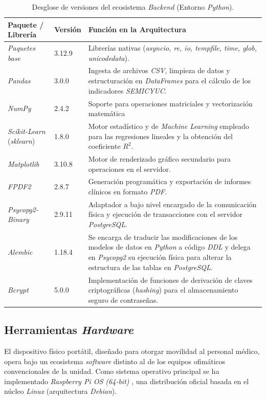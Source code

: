 \begin{table}[hbt!]
\centering
\begin{tabular}{llp{8cm}}
\hline
\textbf{Paquete / Librería} & \textbf{Versión} & \textbf{Función en la Arquitectura} \\ \hline
\textit{Paquetes base} & 3.12.9 & Librerías nativas (\textit{asyncio, re, io, tempfile, time, glob, unicodedata}). \cite{bibpython}\\ 
\textit{Pandas} & 3.0.0 & Ingesta de archivos \textit{CSV}, limpieza de datos y estructuración en \textit{DataFrames} para el cálculo de los indicadores \textit{SEMICYUC}. \cite{pandas}\\ 
\textit{NumPy} & 2.4.2 & Soporte para operaciones matriciales y vectorización matemática \cite{numpy}\\ 
\textit{Scikit-Learn} (\textit{sklearn}) & 1.8.0 & Motor estadístico y de \textit{Machine Learning} empleado para las regresiones lineales y la obtención del coeficiente $R^2$. \cite{SKlearn}\\ 
\textit{Matplotlib} & 3.10.8 & Motor de renderizado gráfico secundario para operaciones en el servidor. \cite{Matplotlib}\\ 
\textit{FPDF2} & 2.8.7 & Generación programática y exportación de informes clínicos en formato \textit{PDF}. \cite{Fpdf2}\\
\textit{Psycopg2-Binary} & 2.9.11 & Adaptador a bajo nivel encargado de la comunicación física y ejecución de transacciones con el servidor \textit{PostgreSQL}. \cite{psycopg2}\\
\textit{Alembic} & 1.18.4 & Se encarga de traducir las modificaciones de los modelos de datos en \textit{Python} a código \textit{DDL} y delega en \textit{Psycopg2} su ejecución física para alterar la estructura de las tablas en \textit{PostgreSQL}. \cite{alembic}\\
\textit{Bcrypt} & 5.0.0 & Implementación de funciones de derivación de claves criptográficas (\textit{hashing}) para el almacenamiento seguro de contraseñas. \cite{bcrypt}\\ \hline 
\end{tabular}
\caption{Desglose de versiones del ecosistema \textit{Backend} (Entorno \textit{Python}).}
\label{tab:versiones_backend}
\end{table}

\subsection{Herramientas \textit{Hardware}}
El dispositivo físico portátil, diseñado para otorgar movilidad al personal médico, opera bajo un ecosistema \textit{software} distinto al de los equipos ofimáticos convencionales de la unidad. Como sistema operativo principal se ha implementado \textit{Raspberry Pi OS (64-bit)} \cite{raspberryOS}, una distribución oficial basada en el núcleo \textit{Linux} (arquitectura \textit{Debian}).

